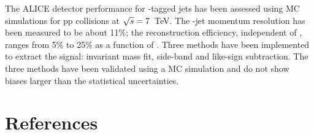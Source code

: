 \documentclass[a4paper]{jpconf}
\begin{document}
The ALICE detector performance for \Dzero-tagged jets has been assessed using MC simulations
for pp collisions at $\sqrt{s}=7$~TeV. The \Dzero-jet momentum resolution has been measured to be about 11\%; the reconstruction efficiency, independent of \ptchjet, ranges from 5\% to 25\% as a function of \ptd.
Three methods have been implemented to extract the signal: invariant mass fit, side-band and like-sign subtraction.
The three methods have been validated using a MC simulation and do not show biases larger than the statistical uncertainties.

\section*{References}
{}

\end{document}
